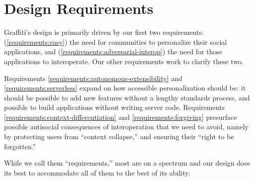 \newtheorem{requirement}{Requirement}

\section{Design Requirements}
\label{requirements}

Graffiti's design is primarily driven by our
first two requirements:
(\ref{requirements:easy})
the need for communities to personalize
their social applications,
and (\ref{requirements:adversarial-interop})
the need for those applications to interoperate.
Our other requirements work to clarify these two.

Requirements \ref{requirements:autonomous-extensibility}
and \ref{requirements:serverless} expand on how accessible
personalization should be: it should be possible to add new features
without a lengthy standards process, and possible to build
applications without writing server code.
Requirements \ref{requirements:context-differentiation}
and \ref{requirements:forgiving}
presurface possible antisocial consequences of
interoperation that we need to avoid,
namely by protecting users from ``context collapse,''
and ensuring their ``right to be forgotten.''

While we call them ``requirements,''
most are on a spectrum and our design
does its best to accommodate all of them
to the best of its ability.





